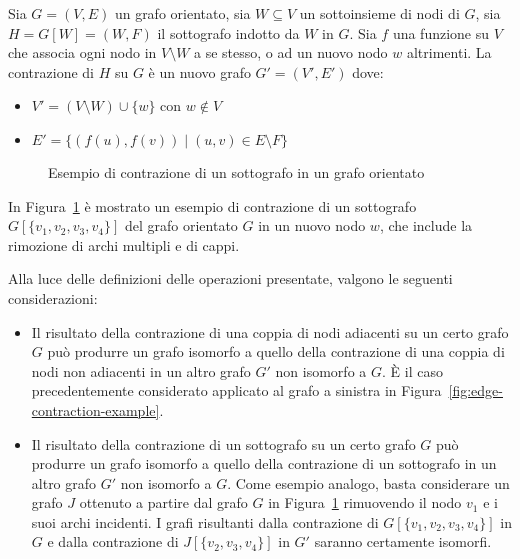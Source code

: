 \begin{definition}
    Sia $G = (V, E)$ un grafo orientato, sia $W \subseteq V$ un sottoinsieme di nodi di $G$, sia $H = G[W] = (W, F)$
    il sottografo indotto da $W$ in $G$.
    Sia $f$ una funzione su $V$ che associa ogni nodo in $V \setminus W$ a se stesso, o ad un nuovo nodo $w$
    altrimenti.
    La contrazione di $H$ su $G$ \`e un nuovo grafo $G' = (V', E')$ dove:
    \begin{itemize}
        \item $V' = (V \setminus W) \cup \{w\}$ con $w \notin V$
        \item $E' = \{(f(u), f(v)) \mid (u, v) \in E \setminus F\}$
    \end{itemize}
\end{definition}

\begin{figure}[h]
    \centering
    
    \caption{Esempio di contrazione di un sottografo in un grafo orientato}
    \label{fig:subgraph-contraction-example}
\end{figure}

In Figura~\ref{fig:subgraph-contraction-example} \`e mostrato un esempio di contrazione di un sottografo
$G[\{v_1, v_2, v_3, v_4\}]$ del grafo orientato $G$ in un nuovo nodo $w$, che include la rimozione di archi multipli
e di cappi. \newline

Alla luce delle definizioni delle operazioni presentate, valgono le seguenti considerazioni:
\begin{itemize}
    \item Il risultato della contrazione di una coppia di nodi adiacenti su un certo grafo $G$ pu\`o produrre un
    grafo isomorfo a quello della contrazione di una coppia di nodi non adiacenti in un altro grafo $G'$ non isomorfo
    a $G$.
    \`E il caso precedentemente considerato applicato al grafo a sinistra in Figura~\ref{fig:edge-contraction-example}.
    \item Il risultato della contrazione di un sottografo su un certo grafo $G$ pu\`o produrre un grafo isomorfo
    a quello della contrazione di un sottografo in un altro grafo $G'$ non isomorfo a $G$.
    Come esempio analogo, basta considerare un grafo $J$ ottenuto a partire dal grafo $G$ in
    Figura~\ref{fig:subgraph-contraction-example} rimuovendo il nodo $v_1$ e i suoi archi incidenti.
    I grafi risultanti dalla contrazione di $G[\{v_1, v_2, v_3, v_4\}]$ in $G$ e dalla contrazione di
    $J[\{v_2, v_3, v_4\}]$ in $G'$ saranno certamente isomorfi.
\end{itemize}


